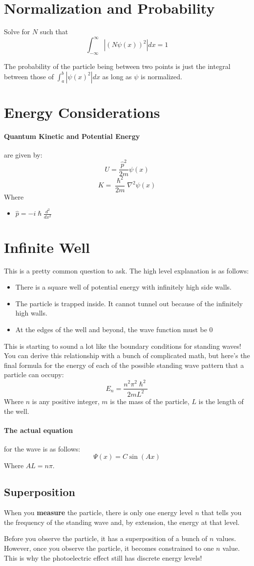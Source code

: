 \documentclass[a4paper,12pt]{report}
\begin{document}
\section{Normalization and Probability}
Solve for $N$ such that $$\int_{-\infty}^{\infty} |(N\psi(x))^2| dx = 1$$

The probability of the particle being between two points is just the integral between those of $\int_a^b |\psi(x)^2| dx$ as long as $\psi$ is 
normalized. 

\section{Energy Considerations}
\paragraph{Quantum Kinetic and Potential Energy} are given by: $$U = \frac{\hat{p}^2}{2m}\psi(x)$$
$$K = \frac{\hslash^2}{2m}\nabla^2\psi(x)$$
Where
\begin{itemize}
\item $\hat{p} = -i\hslash \frac{d^2}{dx^2}$
\end{itemize}

\section{Infinite Well}
This is a pretty common question to ask. The high level explanation is as follows:
\begin{itemize}
\item There is a square well of potential energy with infinitely high side walls.
\item The particle is trapped inside. It cannot tunnel out because of the infinitely high walls.
\item At the edges of the well and beyond, the wave function must be 0
\end{itemize}
This is starting to sound a lot like the boundary conditions for standing waves! You can derive this relationship with a bunch
of complicated math, but here's the final formula for the energy of each of the possible standing wave pattern that a particle 
can occupy: 
$$E_n = \frac{n^2\pi^2\hslash^2}{2mL^2}$$
Where $n$ is any positive integer, $m$ is the mass of the particle, $L$ is the length of the well. 

\paragraph{The actual equation} for the wave is as follows: $$\Psi(x) = C\sin(Ax)$$
Where $AL = n\pi$.

\subsection{Superposition}
When you \textbf{measure} the particle, there is only one energy level $n$ that tells you the frequency of the standing wave and, by extension, 
the energy at that level.

Before you observe the particle, it has a superposition of a bunch of $n$ values. However, once you observe the particle, it becomes constrained 
to one $n$ value. This is why the photoelectric effect still has discrete energy levels!
\end{document}
